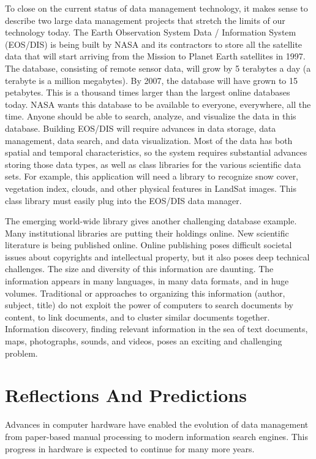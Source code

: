 \documentclass[a4paper,12pt,notitlepage,twoside,openright]{article}
\begin{document}
To close on the current status of data management technology, it makes
sense to describe two large data management projects that stretch the
limits of our technology today. The Earth Observation System Data /
Information System (EOS/DIS) is being built by NASA and its contractors
to store all the satellite data that will start arriving from the
Mission to Planet Earth satellites in 1997. The database, consisting of
remote sensor data, will grow by 5 terabytes a day (a terabyte is a
million megabytes). By 2007, the database will have grown to 15
petabytes. This is a thousand times larger than the largest online
databases today. NASA wants this database to be available to everyone,
everywhere, all the time. Anyone should be able to search, analyze, and
visualize the data in this database. Building EOS/DIS will require
advances in data storage, data management, data search, and data
visualization. Most of the data has both spatial and temporal
characteristics, so the system requires substantial advances storing
those data types, as well as class libraries for the various scientific
data sets. For example, this application will need a library to
recognize snow cover, vegetation index, clouds, and other physical
features in LandSat images. This class library must easily plug into the
EOS/DIS data manager.

The emerging world-wide library gives another challenging database
example. Many institutional libraries are putting their holdings online.
New scientific literature is being published online. Online publishing
poses difficult societal issues about copyrights and intellectual
property, but it also poses deep technical challenges. The size and
diversity of this information are daunting. The information appears in
many languages, in many data formats, and in huge volumes. Traditional
or approaches to organizing this information (author, subject, title) do
not exploit the power of computers to search documents by content, to
link documents, and to cluster similar documents together. Information
discovery, finding relevant information in the sea of text documents,
maps, photographs, sounds, and videos, poses an exciting and challenging
problem.

\hypertarget{reflections-and-predictions}{%
\section{Reflections And
Predictions}\label{reflections-and-predictions}}

Advances in computer hardware have enabled the evolution of data
management from paper-based manual processing to modern information
search engines. This progress in hardware is expected to continue for
many more years.
\end{document}
